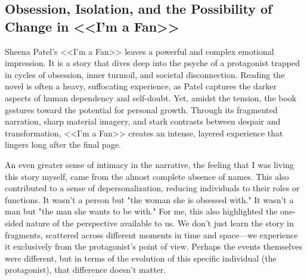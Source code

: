 








\phantom{42} \vspace{-2cm}

\subsection*{Obsession, Isolation, and the Possibility of Change in <<I’m a Fan>>}

Sheena Patel’s <<I’m a Fan>> leaves a powerful and complex emotional impression. It is a story that dives deep into the psyche of a protagonist trapped in cycles of obsession, inner turmoil, and societal disconnection. Reading the novel is often a heavy, suffocating experience, as Patel captures the darker aspects of human dependency and self-doubt. Yet, amidst the tension, the book gestures toward the potential for personal growth. Through its fragmented narration, sharp material imagery, and stark contrasts between despair and transformation, <<I’m a Fan>> creates an intense, layered experience that lingers long after the final page.

An even greater sense of intimacy in the narrative, the feeling that I was living this story myself, came from the almost complete absence of names. This also contributed to a sense of depersonalization, reducing individuals to their roles or functions. It wasn’t a person but "the woman she is obsessed with." It wasn’t a man but "the man she wants to be with." For me, this also highlighted the one-sided nature of the perspective available to us. We don’t just learn the story in fragments, scattered across different moments in time and space—we experience it exclusively from the protagonist’s point of view. Perhaps the events themselves were different, but in terms of the evolution of this specific individual (the protagonist), that difference doesn’t matter.

